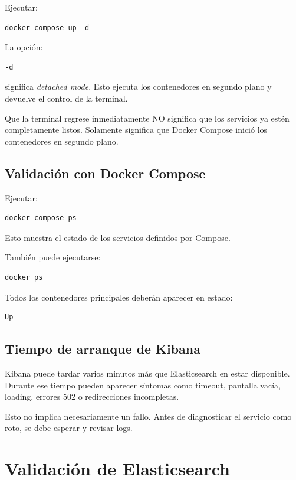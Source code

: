 \documentclass[
  coursetitle={Cómputo Nube y Tecnologías Emergentes},
  coursehours={96},
  coursedate={Verano 2026},
  doctype={Laboratorio},
  otherlangs={english,french},
  authorname={Lázaro},
  authorsurname={Bustio-Martínez},
  authortitle={PhD},
  role={Profesor Investigador},
  email={lbustio@inaoe.mx},
  phone={5559504000},
  ext={7459},
  institution={Instituto Nacional de Astrofísica, Óptica y Electrónica (INAOE)},
  department={Maestría en Ciencias en Tecnologías de Seguridad},
  address={Luis Enrique Erro 1, Sta. Ma. Tonantzintla, San Andrés Cholula, CP 72840, Puebla, México},
  margin={0.5in}
]{../../lbustio_lecture_notes}
\begin{document}
Ejecutar:

\begin{lstlisting}
docker compose up -d
\end{lstlisting}

La opción:

\begin{verbatim}
-d
\end{verbatim}

significa \textit{detached mode}. Esto ejecuta los contenedores en segundo plano y devuelve el control de la terminal.

Que la terminal regrese inmediatamente NO significa que los servicios ya estén completamente listos. Solamente significa que Docker Compose inició los contenedores en segundo plano.

\subsection{Validación con Docker Compose}

Ejecutar:

\begin{lstlisting}
docker compose ps
\end{lstlisting}

Esto muestra el estado de los servicios definidos por Compose.

También puede ejecutarse:

\begin{lstlisting}
docker ps
\end{lstlisting}

Todos los contenedores principales deberán aparecer en estado:

\begin{verbatim}
Up
\end{verbatim}

\subsection{Tiempo de arranque de Kibana}

Kibana puede tardar varios minutos más que Elasticsearch en estar disponible. Durante ese tiempo pueden aparecer síntomas como timeout, pantalla vacía, loading, errores 502 o redirecciones incompletas.

Esto no implica necesariamente un fallo. Antes de diagnosticar el servicio como roto, se debe esperar y revisar logs.

\section{Validación de Elasticsearch}
\end{document}
